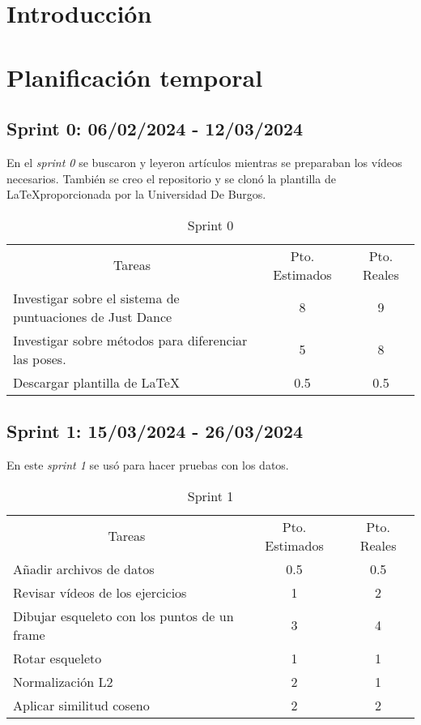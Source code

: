 
\section{Introducción}

\section{Planificación temporal}

\subsection{Sprint 0: 06/02/2024 - 12/03/2024}
En el \textit{sprint 0} se buscaron y leyeron artículos mientras se preparaban los vídeos necesarios. También se creo el repositorio y se clonó la plantilla de \LaTeX proporcionada por la Universidad De Burgos.

\begin{table}[H]
	\begin{tabular}{lcc}
		\multicolumn{1}{c}{Tareas} & Pto. Estimados & Pto. Reales\\
		Investigar sobre el sistema de puntuaciones de Just Dance & 8 & 9 \\
	 	Investigar sobre métodos para diferenciar las poses. & 5 & 8 \\
	 	Descargar plantilla de \LaTeX & 0.5 & 0.5 \\
	\end{tabular}
\caption{Sprint 0}
\label{sprint0}
\end{table}

\subsection{Sprint 1: 15/03/2024 - 26/03/2024}
En este \textit{sprint 1} se usó para hacer pruebas con los datos.

\begin{table}[H]
	\begin{tabular}{lcc}
		\multicolumn{1}{c}{Tareas} & Pto. Estimados & Pto. Reales\\
		Añadir archivos de datos & 0.5 & 0.5 \\
		Revisar vídeos de los ejercicios & 1 & 2 \\
		Dibujar esqueleto con los puntos de un frame & 3 & 4 \\
		Rotar esqueleto & 1 & 1 \\
		Normalización L2 & 2 & 1 \\
		Aplicar similitud coseno & 2 & 2 \\
		
	\end{tabular}
	\caption{Sprint 1}
	\label{sprint1}
\end{table}

